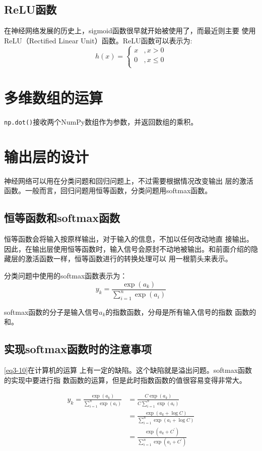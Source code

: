 \subsection{ReLU函数}
在神经网络发展的历史上，sigmoid函数很早就开始被使用了，而最近则主要
使用ReLU（Rectified Linear Unit）函数。ReLU函数可以表示为:
\begin{equation}
    h(x)=\left\{
    \begin{array}{ll}
        x & , x>0     \\
        0 & , x\leq 0 \\
    \end{array}
    \right.
\end{equation}
\section{多维数组的运算}
\verb|np.dot()|接收两个NumPy数组作为参数，并返回数组的乘积。

\section{输出层的设计}
神经网络可以用在分类问题和回归问题上，不过需要根据情况改变输出
层的激活函数。一般而言，回归问题用恒等函数，分类问题用softmax函数。
\subsection{恒等函数和softmax函数}
恒等函数会将输入按原样输出，对于输入的信息，不加以任何改动地直
接输出。因此，在输出层使用恒等函数时，输入信号会原封不动地被输出。和前面介绍的隐藏层的激活函数一样，恒等函数进行的转换处理可以
用一根箭头来表示。

分类问题中使用的softmax函数表示为：
\begin{equation}
    \label{eq3-10}
    y_k=\frac{\exp(a_k)}{\sum\limits_{i=1}^n{\exp(a_i)}}
\end{equation}

softmax函数的分子是输入信号$a_k$的指数函数，分母是所有输入信号的指数
函数的和。

\subsection{实现softmax函数时的注意事项}
\autoref{eq3-10}在计算机的运算
上有一定的缺陷。这个缺陷就是溢出问题。softmax函数的实现中要进行指
数函数的运算，但是此时指数函数的值很容易变得非常大。

\begin{equation}
    \begin{aligned}
        y_k=\frac{\exp(a_k)}{\sum\limits_{i=1}^n{\exp(a_i)}} & =\frac{C\exp(a_k)}{C\sum\limits_{i=1}^n{\exp(a_i)}}             \\
                                                             & =\frac{\exp(a_k+\log C)}{\sum\limits_{i=1}^n{\exp(a_i+\log C)}} \\
                                                             & =\frac{\exp(a_k+C^{'})}{\sum\limits_{i=1}^n{\exp(a_i+C^{'})}}   \\
    \end{aligned}
\end{equation}


